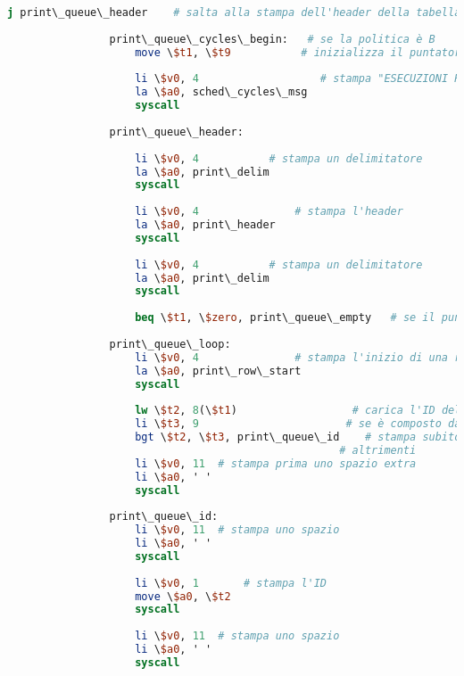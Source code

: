 \begin{center}
\begin{lstlisting}[language=mips, gobble=14, stepnumber=1]
                    j print\_queue\_header    # salta alla stampa dell'header della tabella
                    
                print\_queue\_cycles\_begin:   # se la politica è B
                    move \$t1, \$t9           # inizializza il puntatore \$t1 col puntatore di B
                
                    li \$v0, 4                   # stampa "ESECUZIONI RIMANENTI"
                    la \$a0, sched\_cycles\_msg
                    syscall
                    
                print\_queue\_header:
                    
                    li \$v0, 4           # stampa un delimitatore
                    la \$a0, print\_delim
                    syscall
                    
                    li \$v0, 4               # stampa l'header
                    la \$a0, print\_header
                    syscall
                    
                    li \$v0, 4           # stampa un delimitatore
                    la \$a0, print\_delim
                    syscall
                    
                    beq \$t1, \$zero, print\_queue\_empty   # se il puntatore d'inizio è zero, salta alla stampa della coda vuota
                    
                print\_queue\_loop:
                    li \$v0, 4               # stampa l'inizio di una riga
                    la \$a0, print\_row\_start
                    syscall
                    
                    lw \$t2, 8(\$t1)                  # carica l'ID del task attuale
                    li \$t3, 9                       # se è composto da due cifre
                    bgt \$t2, \$t3, print\_queue\_id    # stampa subito l'ID
                                                    # altrimenti
                    li \$v0, 11  # stampa prima uno spazio extra
                    li \$a0, ' '
                    syscall
                    
                print\_queue\_id:
                    li \$v0, 11  # stampa uno spazio
                    li \$a0, ' '
                    syscall
                
                    li \$v0, 1       # stampa l'ID
                    move \$a0, \$t2
                    syscall
                    
                    li \$v0, 11  # stampa uno spazio
                    li \$a0, ' '
                    syscall
                    

\end{lstlisting}
\end{center}
